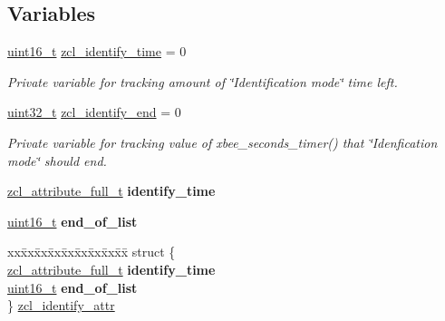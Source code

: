 \subsection*{Variables}
\begin{DoxyCompactItemize}
\item 
\mbox{\label{group__zcl__identify_ga2cb1b23d3ccb08ae200e797358694d51}} 
\hyperlink{group__hal__dos_ga5a8b2dc9e45a9ee81a94ef304fb62505}{uint16\+\_\+t} \hyperlink{group__zcl__identify_ga2cb1b23d3ccb08ae200e797358694d51}{zcl\+\_\+identify\+\_\+time} = 0
\begin{DoxyCompactList}\small\item\em Private variable for tracking amount of \char`\"{}\+Identification mode\char`\"{} time left. \end{DoxyCompactList}\item 
\hyperlink{group__hal__dos_ga09a1e304d66d35dd47daffee9731edaa}{uint32\+\_\+t} \hyperlink{group__zcl__identify_ga467ad1e40ea8475b4e49865436883e94}{zcl\+\_\+identify\+\_\+end} = 0
\begin{DoxyCompactList}\small\item\em Private variable for tracking value of xbee\+\_\+seconds\+\_\+timer() that \char`\"{}\+Idenfication mode\char`\"{} should end. \end{DoxyCompactList}\item 
\hyperlink{structzcl__attribute__full__t}{zcl\+\_\+attribute\+\_\+full\+\_\+t} {\bfseries identify\+\_\+time}
\item 
\hyperlink{group__hal__dos_ga5a8b2dc9e45a9ee81a94ef304fb62505}{uint16\+\_\+t} {\bfseries end\+\_\+of\+\_\+list}
\item 
\begin{tabbing}
xx\=xx\=xx\=xx\=xx\=xx\=xx\=xx\=xx\=\kill
struct \{\\
\>\hyperlink{structzcl__attribute__full__t}{zcl\_attribute\_full\_t} {\bfseries identify\_time}\\
\>\hyperlink{group__hal__dos_ga5a8b2dc9e45a9ee81a94ef304fb62505}{uint16\_t} {\bfseries end\_of\_list}\\
\} \hyperlink{group__zcl__identify_ga794a6ffcf3d47884c65a8a2c9e60851b}{zcl\_identify\_attr}\\


\end{tabbing}
\end{DoxyCompactItemize}

